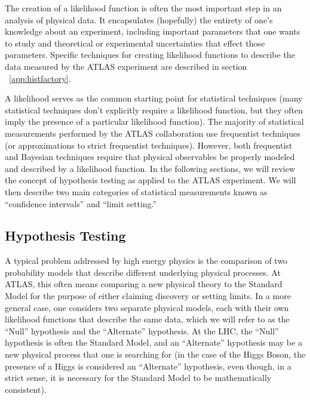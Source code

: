 
The creation of a likelihood function is often the most important step in an analysis of physical data.
It encapsulates (hopefully) the entirety of one's knowledge about an experiment, including important parameters that one wants to study and theoretical or experimental uncertainties that effect those parameters.
Specific techniques for creating likelihood functions to describe the data measured by the ATLAS experiment are described in section ~\ref{app:histfactory}.

A likelihood serves as the common starting point for statistical techniques (many statistical techniques don't explicitly require a likelihood function, but they often imply the presence of a particular likelihood function).
The majority of statistical measurements performed by the ATLAS collaboration use frequentist techniques (or approximations to strict frequentist techniques).
However, both frequentist and Bayesian techniques require that physical observables be properly modeled and described by a likelihood function.
In the following sections, we will review the concept of hypothesis testing as applied to the ATLAS experiment.
We will then describe two main categories of statistical measurements known as ``confidence intervals'' and ``limit setting.''


\subsection{Hypothesis Testing}
A typical problem addressed by high energy physics is the comparison of two probability models that describe different underlying physical processes.
At ATLAS, this often means comparing a new physical theory to the Standard Model for the purpose of either claiming discovery or setting limits.
In a more general case, one considers two separate physical models, each with their own likelihood functions that describe the same data, which we will refer to as the ``Null'' hypothesis and the ``Alternate'' hypothesis.
At the LHC, the ``Null'' hypothesis is often the Standard Model, and an ``Alternate'' hypothesis may be a new physical process that one is searching for (in the case of the Higgs Boson, the presence of a Higgs is considered an ``Alternate'' hypothesis, even though, in a strict sense, it is necessary for the Standard Model to be mathematically consistent).

